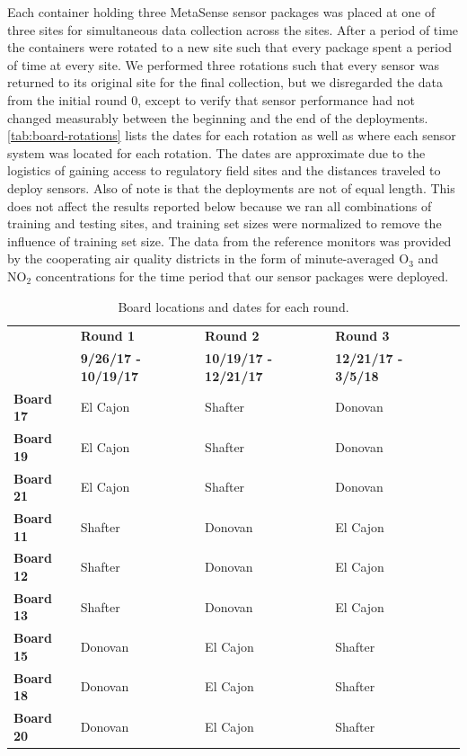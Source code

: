 \documentclass[journal abbreviation, manuscript]{copernicus}
\newcommand{\textus}[1]{$_{\text{#1}}$}
\begin{document}
Each container holding three MetaSense sensor packages was placed at one of three sites for simultaneous data collection across the sites. After a period of time the containers were rotated to a new site such that every package spent a period of time at every site.  We performed three rotations such that every sensor was returned to its original site for the final collection, but we disregarded the data from the initial round 0, except to verify that sensor performance had not changed measurably between the beginning and the end of the deployments. \autoref{tab:board-rotations} lists the dates for each rotation as well as where each sensor system was located for each rotation.  The dates are approximate due to the logistics of gaining access to regulatory field sites and the distances traveled to deploy sensors.  Also of note is that the deployments are not of equal length.  This does not affect the results reported below because we ran all combinations of training and testing sites, and training set sizes were normalized to remove the influence of training set size. The data from the reference monitors was provided by the cooperating air quality districts in the form of minute-averaged O\textus{3} and NO\textus{2} concentrations for the time period that our sensor packages were deployed.

\begin{table}[t]
\centering
\caption{Board locations and dates for each round.}
\begin{tabular}{l|llll}
                  & \textbf{Round 1} &            \textbf{Round 2} &                   \textbf{Round 3} \\
         & \textbf{9/26/17 - 10/19/17} & \textbf{10/19/17 - 12/21/17} & \textbf{12/21/17 - 3/5/18} \\ \hline
\textbf{Board 17} & El Cajon    & Shafter      & Donovan    \\
\textbf{Board 19} &  El Cajon    & Shafter     & Donovan   \\
\textbf{Board 21} &  El Cajon    & Shafter     & Donovan  \\ \hline
\textbf{Board 11} &  Shafter      & Donovan  & El Cajon  \\
\textbf{Board 12} &  Shafter      & Donovan  & El Cajon  \\
\textbf{Board 13} &  Shafter      & Donovan  & El Cajon  \\ \hline
\textbf{Board 15} &  Donovan   & El Cajon   & Shafter    \\
\textbf{Board 18} &  Donovan   & El Cajon   & Shafter     \\
\textbf{Board 20} &  Donovan   & El Cajon   & Shafter   
\end{tabular}
\label{tab:board-rotations}
\end{table}
\end{document}
